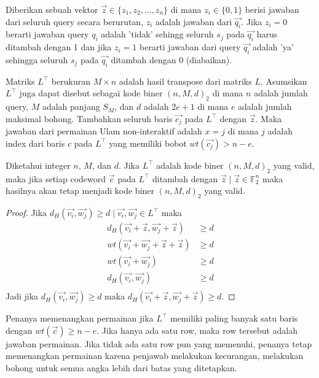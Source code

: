 Diberikan sebuah vektor $\vec{z} \in \{z_1,z_2,\ldots,z_n\}$ di mana $z_i \in \{0,1\}$ berisi jawaban dari seluruh query secara berurutan, $z_i$ adalah jawaban dari $\vec{q_i}$. Jika $z_i=0$ berarti jawaban query $q_i$ adalah 'tidak' sehingg seluruh $s_j$ pada $\vec{q_i}$ harus ditambah dengan 1 dan jika $z_i=1$ berarti jawaban dari query $\vec{q_i}$ adalah 'ya' sehingga seluruh $s_j$ pada $\vec{q_i}$ ditambah dengan 0 (diabaikan).

Matriks $L^\top$ berukuran $M \times n$ adalah hasil transpose dari matriks $L$. Asumsikan $L^\top$ juga dapat disebut sebagai kode biner $(n,M,d)_2$ di mana $n$ adalah jumlah query, $M$ adalah panjang $S_M$, dan $d$ adalah $2e+1$ di mana $e$ adalah jumlah maksimal bohong. Tambahkan seluruh baris $\vec{c_j}$ pada $L^\top$ dengan $\vec{z}$. Maka jawaban dari permainan Ulam non-interaktif adalah $x = j$ di mana $j$ adalah index dari baris $c$ pada $L^\top$ yang memiliki bobot $wt(\vec{c_j}) > n-e$.

\begin{lemma}
Diketahui integer $n$, $M$, dan $d$. Jika $L^\top$ adalah kode biner $(n,M,d)_2$ yang valid, maka jika setiap codeword $\vec{c}$ pada $L^\top$ ditambah dengan $\vec{z} \mid \vec{z} \in \mathbb{F}_2^n$ maka hasilnya akan tetap menjadi kode biner $(n,M,d)_2$ yang valid.
\end{lemma}

\begin{proof}
Jika $d_H(\vec{v_i},\vec{w_j}) \ge d \mid \vec{v_i},\vec{w_j} \in L^\top$ maka
\begin{align*}
d_H(\vec{v_i}+\vec{z},\vec{w_j}+\vec{z}) &\ge d \\
wt(\vec{v_i}+\vec{w_j}+\vec{z}+\vec{z}) &\ge d \\
wt(\vec{v_i}+\vec{w_j}) &\ge d \\
d_H(\vec{v_i},\vec{w_j}) &\ge d \\
\end{align*}
Jadi jika $d_H(\vec{v_i},\vec{w_j}) \ge d$ maka $d_H(\vec{v_i}+\vec{z},\vec{w_j}+\vec{z}) \ge d$.
\end{proof}

Penanya memenangkan permainan jika $L^\top$ memiliki paling banyak satu baris dengan $wt(\vec{c}) \ge n-e$. Jika hanya ada satu row, maka row tersebut adalah jawaban permainan. Jika tidak ada satu row pun yang memenuhi, penanya tetap memenangkan permainan karena penjawab melakukan kecurangan, melakukan bohong untuk semua angka lebih dari batas yang ditetapkan.

